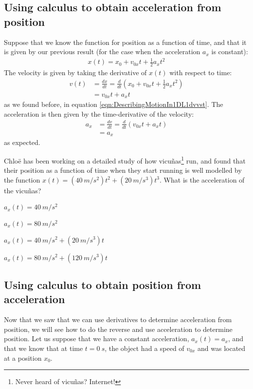 \subsection{Using calculus to obtain acceleration from position}
Suppose that we know the function for position as a function of time, and that it is given by our previous result (for the case when the acceleration $a_x$ is constant):
\begin{align*}
x(t)=x_0+v_{0x}t+\frac{1}{2}a_xt^2
\end{align*}
The velocity is given by taking the derivative of $x(t)$ with respect to time:
\begin{align*}
v(t)&=\frac{dx}{dt}=\frac{d}{dt}\left(x_0+v_{0x}t+\frac{1}{2}a_xt^2\right)\\
&=v_{0x}t+a_xt
\end{align*}
as we found before, in equation \ref{eqn:DescribingMotionIn1DL1dvvst}. The acceleration is then given by the time-derivative of the velocity:
\begin{align*}
a_x &= \frac{dv}{dt}=\frac{d}{dt}\left(v_{0x}t+a_xt\right)\\
&=a_x
\end{align*}
as expected.


\begin{checkpointMC}{Chlo\"e has been working on a detailed study of how vicu\~nas\footnote{Never heard of vicu\~nas? Internet!} run, and found that their position as a function of time when they start running is well modelled by the function $x(t)=(\SI{40}{m/s^2})t^2+(\SI{20}{m/s^3})t^3$. What is the acceleration of the vicu\~nas?}
\item $a_x(t)=\SI{40}{m/s^2}$
\item $a_x(t)=\SI{80}{m/s^2}$
\item $a_x(t)=\SI{40}{m/s^2}+(\SI{20}{m/s^3})t$
\item $a_x(t)=\SI{80}{m/s^2}+(\SI{120}{m/s^3})t$ %
\end{checkpointMC}

\subsection{Using calculus to obtain position from acceleration}
Now that we saw that we can use derivatives to determine acceleration from position, we will see how to do the reverse and use acceleration to determine position. Let us suppose that we have a constant acceleration, $a_x(t)=a_x$, and that we know that at time $t=\SI{0}{s}$, the object had a speed of $v_{0x}$ and was located at a position $x_0$. 

